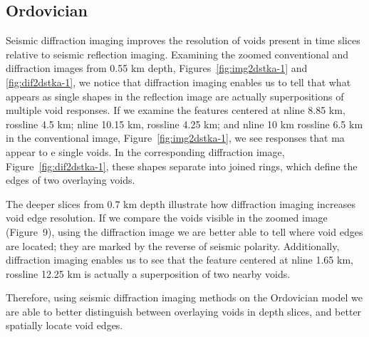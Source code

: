 \subsection{Ordovician}
\par
Seismic diffraction imaging improves the resolution of voids present in time slices relative to seismic reflection imaging.  Examining the zoomed conventional and diffraction images from 0.55 km depth, Figures~\ref{fig:img2dstka-1} and \ref{fig:dif2dstka-1}, we notice that diffraction imaging enables us to tell that what appears as single shapes in the reflection image are actually superpositions of multiple void responses.  If we examine the features centered at nline 8.85 km, rossline 4.5 km; nline 10.15 km, rossline 4.25 km; and nline 10 km rossline 6.5 km in the conventional image, Figure~\ref{fig:img2dstka-1}, we see responses that ma appear to e single voids.  In the corresponding diffraction image, Figure~\ref{fig:dif2dstka-1}, these shapes separate into joined rings, which define the edges of two overlaying voids.
\par
The deeper slices from 0.7 km depth illustrate how diffraction imaging increases void edge resolution.  If we compare the voids visible in the zoomed image (Figure~9), using the diffraction image we are better able to tell where void edges are located; they are marked by the reverse of seismic polarity.  Additionally, diffraction imaging enables us to  see that the feature centered at nline 1.65 km, rossline 12.25 km is actually a superposition of two nearby voids.
\par
Therefore, using seismic diffraction imaging methods on the Ordovician model we are able to better distinguish between overlaying voids in depth slices, and better spatially locate void edges.

